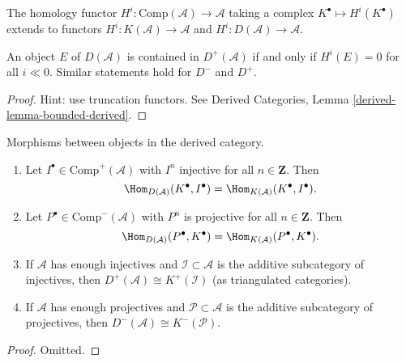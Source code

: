 \noindent
The homology functor $H^i: \text{Comp}(\mathcal{A}) \to \mathcal{A}$ taking a
complex $K^\bullet \mapsto H^i(K^\bullet)$ extends to functors $H^i:
K(\mathcal{A}) \to \mathcal{A}$ and $H^i: D(\mathcal{A}) \to \mathcal{A}$.

\begin{lemma}
\label{lemma-when-in-bounded}
An object $E$ of $D(\mathcal{A})$ is contained in $D^+(\mathcal{A})$ if and
only if $H^i(E) =0 $ for all $i \ll 0$. Similar statements hold for $D^-$ and
$D^+$.
\end{lemma}

\begin{proof}
Hint: use truncation functors. See
Derived Categories, Lemma \ref{derived-lemma-bounded-derived}.
\end{proof}

\begin{lemma}
\label{lemma-derived-categories}
Morphisms between objects in the derived category.
\begin{enumerate}
\item
Let $I^\bullet \in \text{Comp}^+(\mathcal{A})$ with $I^n$ injective for all
$n \in \mathbf{Z}$. Then
$$
\Hom_{D(\mathcal{A})}(K^\bullet, I^\bullet)
=
\Hom_{K(\mathcal{A})}(K^\bullet, I^\bullet).
$$
\item
Let $P^\bullet \in \text{Comp}^-(\mathcal{A})$ with $P^n$ is projective for all
$n \in \mathbf{Z}$. Then
$$
\Hom_{D(\mathcal{A})}(P^\bullet, K^\bullet)
=
\Hom_{K(\mathcal{A})}(P^\bullet, K^\bullet).
$$
\item
If $\mathcal{A}$ has enough injectives and $\mathcal{I} \subset \mathcal{A}$
is the additive subcategory of injectives, then
$
D^+(\mathcal{A})\cong K^+(\mathcal{I})
$
(as triangulated categories).
\item
If $\mathcal{A}$ has enough projectives and $\mathcal{P} \subset \mathcal{A}$
is the additive subcategory of projectives, then
$
D^-(\mathcal{A}) \cong K^-(\mathcal{P}).
$
\end{enumerate}
\end{lemma}

\begin{proof}
Omitted.
\end{proof}

